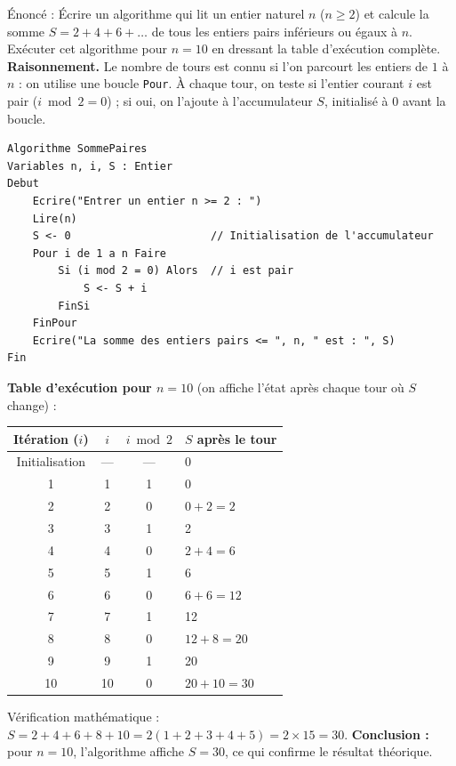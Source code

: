 \documentclass[11pt]{article}
\begin{document}
\begin{exoresolu}
Énoncé : Écrire un algorithme qui lit un entier naturel $n$ ($n \geq 2$) et calcule la somme $S = 2 + 4 + 6 + \dots$ de tous les entiers pairs inférieurs ou égaux à $n$. Exécuter cet algorithme pour $n = 10$ en dressant la table d'exécution complète.
\tcblower
\textbf{Raisonnement.} Le nombre de tours est connu si l'on parcourt les entiers de $1$ à $n$ : on utilise une boucle \texttt{Pour}. À chaque tour, on teste si l'entier courant $i$ est pair ($i \bmod 2 = 0$) ; si oui, on l'ajoute à l'accumulateur $S$, initialisé à $0$ avant la boucle.

\begin{lstlisting}
Algorithme SommePaires
Variables n, i, S : Entier
Debut
    Ecrire("Entrer un entier n >= 2 : ")
    Lire(n)
    S <- 0                      // Initialisation de l'accumulateur
    Pour i de 1 a n Faire
        Si (i mod 2 = 0) Alors  // i est pair
            S <- S + i
        FinSi
    FinPour
    Ecrire("La somme des entiers pairs <= ", n, " est : ", S)
Fin
\end{lstlisting}

\textbf{Table d'exécution pour $n = 10$} (on affiche l'état après chaque tour où $S$ change) :

\begin{center}
\begin{tabularx}{\linewidth}{|c|c|c|X|}
\hline
\rowcolor{popblueL} Itération ($i$) & $i$ & $i \bmod 2$ & $S$ après le tour \\
\hline
Initialisation & --- & --- & 0 \\
\hline
1 & 1 & 1 & 0 \\
\hline
2 & 2 & 0 & $0+2=2$ \\
\hline
3 & 3 & 1 & 2 \\
\hline
4 & 4 & 0 & $2+4=6$ \\
\hline
5 & 5 & 1 & 6 \\
\hline
6 & 6 & 0 & $6+6=12$ \\
\hline
7 & 7 & 1 & 12 \\
\hline
8 & 8 & 0 & $12+8=20$ \\
\hline
9 & 9 & 1 & 20 \\
\hline
10 & 10 & 0 & $20+10=30$ \\
\hline
\end{tabularx}
\end{center}

Vérification mathématique : $S = 2+4+6+8+10 = 2(1+2+3+4+5) = 2 \times 15 = 30$. \textbf{Conclusion :} pour $n = 10$, l'algorithme affiche $S = 30$, ce qui confirme le résultat théorique.
\end{exoresolu}
\end{document}
